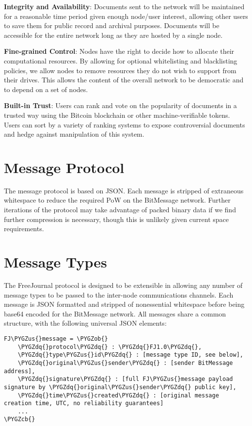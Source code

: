 \documentclass[letterpaper,10pt,oneside]{sphinxmanual}
\def\PYGZus{\char`\_}
\def\PYGZob{\char`\{}
\def\PYGZcb{\char`\}}
\def\PYGZdq{\char`\"}
\begin{document}
\textbf{Integrity and Availability}: Documents sent to the network will be maintained for a reasonable time period given enough
node/user interest, allowing other users to save them for public record and archival purposes.  Documents will be accessible for
the entire network long as they are hosted by a single node.

\textbf{Fine-grained Control}: Nodes have the right to decide how to allocate their computational resources.  By allowing for
optional whitelisting and blacklisting policies, we allow nodes to remove resources they do not wish to support from their
drives.  This allows the content of the overall network to be democratic and to depend on a set of nodes.

\textbf{Built-in Trust}: Users can rank and vote on the popularity of documents in a trusted way using the Bitcoin blockchain or
other machine-verifiable tokens.  Users can sort by a variety of ranking systems to expose controversial documents and hedge
against manipulation of this system.


\section{Message Protocol}
\label{protocol:message-protocol}
The message protocol is based on JSON.  Each message is stripped of extraneous whitespace to reduce the required PoW on the
BitMessage network.  Further iterations of the protocol may take advantage of packed binary data if we find further compression
is necessary, though this is unlikely given current space requirements.


\section{Message Types}
\label{protocol:message-types}
The FreeJournal protocol is designed to be extensible in allowing any number of message types to be passed to the inter-node
communications channels.  Each message is JSON formatted and stripped of nonessential whitespace before being base64 encoded for
the BitMessage network.  All messages share a common structure, with the following universal JSON elements:

\begin{Verbatim}[commandchars=\\\{\}]
FJ\PYGZus{}message = \PYGZob{}
    \PYGZdq{}protocol\PYGZdq{} : \PYGZdq{}FJ1.0\PYGZdq{},
    \PYGZdq{}type\PYGZus{}id\PYGZdq{} : [message type ID, see below],
    \PYGZdq{}original\PYGZus{}sender\PYGZdq{} : [sender BitMessage address],
    \PYGZdq{}signature\PYGZdq{} : [full FJ\PYGZus{}message payload signature by \PYGZdq{}original\PYGZus{}sender\PYGZdq{} public key],
    \PYGZdq{}time\PYGZus{}created\PYGZdq{} : [original message creation time, UTC, no reliability guarantees]
    ...
\PYGZcb{}
\end{Verbatim}
\end{document}
